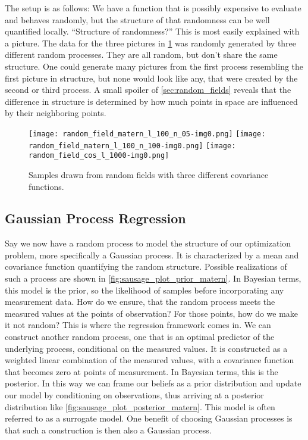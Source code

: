 The setup is as follows: We have a function that is possibly expensive to evaluate and behaves randomly, but the structure of that randomness can be well quantified locally.
``Structure of randomness?'' This is most easily explained with a picture. 
The data for the three pictures in \cref{fig:random_fields_intro.png} was randomly generated by three different random processes. 
They are all random, but don't share the same structure.
One could generate many pictures from the first process resembling the first picture in structure, but none would look like any, that were created by the second or third process.
A small spoiler of \cref{sec:random_fields} reveals that the difference in structure is determined by how much points in space are influenced by their neighboring points. 

\begin{figure}[b]
    \centering
    \texttt{[image: random\_field\_matern\_l\_100\_n\_05-img0.png]}
    \texttt{[image: random\_field\_matern\_l\_100\_n\_100-img0.png]}
    \texttt{[image: random\_field\_cos\_l\_1000-img0.png]}
    \caption{Samples drawn from random fields with three different covariance functions.}
    \label{fig:random_fields_intro.png}
\end{figure}








\subsection*{Gaussian Process Regression}
Say we now have a random process to model the structure of our optimization problem, more specifically a Gaussian process. It is characterized by a mean and covariance function quantifying the random structure. 
Possible realizations of such a process are shown in \cref{fig:sausage_plot_prior_matern}.
In Bayesian terms, this model is the prior, so the likelihood of samples before incorporating any measurement data.
How do we ensure, that the random process meets the measured values at the points of observation? 
For those points, how do we make it not random?
This is where the regression framework comes in. 
We can construct another random process, one that is an optimal predictor of the underlying process, conditional on the measured values.
It is constructed as a weighted linear combination of the measured values, with a covariance function that becomes zero at points of measurement. 
In Bayesian terms, this is the posterior.
In this way we can frame our beliefs as a prior distribution and update our model by conditioning on observations, thus arriving at a posterior distribution like \cref{fig:sausage_plot_posterior_matern}. 
This model is often referred to as a surrogate model.
One benefit of choosing Gaussian processes is that such a construction is then also a Gaussian process. 

